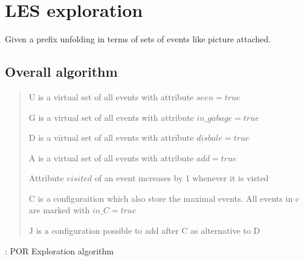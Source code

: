 \documentclass[11pt]{article}
\begin{document}
\section{LES exploration}

	Given a prefix unfolding in terms of sets of events like picture attached.

	\begin{figure}
	\end{figure}

	\subsection{Overall algorithm}
	\begin{verse}
			
		U is a virtual set of all events with attribute $seen=true$
	
		G is a virtual set of all events with attribute $in\_gabage=true$
		
		D is a virtual set of all events with attribute $disbale=true$
		
		A is a virtual set of all events with attribute $add=true$
		
		Attribute $visited$ of an event increases by 1 whenever it is visted
		
		C is a configuraition which also store the maximal events. All events in c are marked with $in\_C=true$
		
		J is a configuration possible to add after C as alternative to D
		
	\end{verse}
	
		\begin{algorithm}
		\caption{: POR Exploration algorithm}
		\begin{algorithmic}[1]
				\let\emptyset\varnothing
				\If {$ en(C) = \emptyset $}
					\Return {}
				\EndIf
				\If {$A=\emptyset$}
				\Else
				\EndIf
				
				
				
				\EndIf
			\EndProcedure
		\end{algorithmic}
		\end{algorithm}
		
\end{document}
